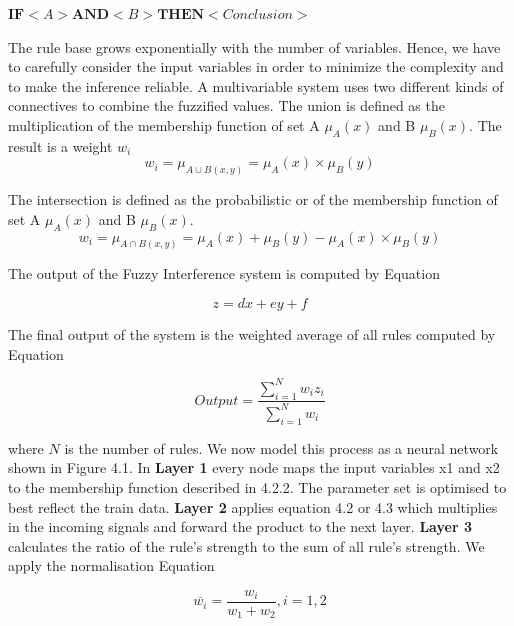 \centerline {$ \textbf{IF} <  A  > \textbf{AND} <  B  > \textbf{THEN} < Conclusion > $}

The rule base grows exponentially with the number of variables. Hence, we have to carefully consider the input variables in order to minimize the complexity and to make the inference reliable. A multivariable system uses two different kinds of connectives to combine the fuzzified values. The union is defined as the multiplication of the membership function of set A $\mu_A(x)$ and B $\mu_B(x).$ The result is a weight $w_i$
 \begin{equation} \label{eq:gaus}
 w_i =  \mu_{A\cup B(x,y)} =   \mu_A (x) \times \mu_B(y)
 \end{equation}

The intersection is defined as the probabilistic or of the membership function of set A $\mu_A(x)$ and B $\mu_B(x).$ 
\begin{equation} \label{eq:gaus}
 w_i =  \mu_{A\cap B(x,y)} =   \mu_A (x)  + \mu_B(y) -  \mu_A (x)  \times \mu_B(y)
 \end{equation}

The output of the Fuzzy Interference system is computed by Equation 


\begin{equation} \label{eq:gaus}
 z = dx + ey + f  \end{equation}

The final output of the system is the weighted average of all rules computed by Equation 

\begin{equation} \label{eq:gaus}
Output = \frac { \sum\limits_{i=1}^N  w_i z_i} {\sum\limits_{i=1}^N  w_i } \end{equation}

where $N$ is the number of rules. We now model this process as a neural network  shown in Figure 4.1. In \textbf{Layer 1} every node maps the input variables x1 and x2 to the membership function described in 4.2.2. The parameter set is optimised to best reflect the train data. \textbf{Layer 2} applies equation 4.2 or 4.3 which multiplies in the incoming signals and forward the product to the next layer. \textbf {Layer 3} calculates the ratio of the rule's strength to the sum of all rule's strength. We apply the normalisation Equation 

\begin{equation} \label{eq:gaus}
\overline{w_i} =  \frac{w_i}{w_1 + w_2}, i = 1,2 \end{equation}

